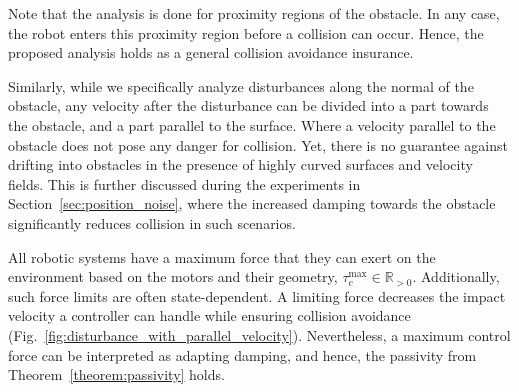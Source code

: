 Note that the analysis is done for proximity regions of the obstacle. In any case, the robot enters this proximity region before a collision can occur. Hence, the proposed analysis holds as a general collision avoidance insurance.

Similarly, while we specifically analyze disturbances along the normal of the obstacle, any velocity after the disturbance can be divided into a part towards the obstacle, and a part parallel to the surface. Where a velocity parallel to the obstacle does not pose any danger for collision.
Yet, there is no guarantee against drifting into obstacles in the presence of highly curved surfaces and velocity fields. \iflong This is further discussed during the experiments in Section~\ref{sec:position_noise}, where the increased damping towards the obstacle significantly reduces collision in such scenarios. \fi

All robotic systems have a maximum force that they can exert on the environment based on the motors and their geometry, $\tau_c^{\mathrm{max}} \in \mathbb{R}_{>0}$. Additionally, such force limits are often state-dependent. A limiting force decreases the impact velocity a controller can handle while ensuring collision avoidance (Fig.~\ref{fig:disturbance_with_parallel_velocity}). Nevertheless, a maximum control force can be interpreted as adapting damping, and hence, the passivity from Theorem~\ref{theorem:passivity} holds.


